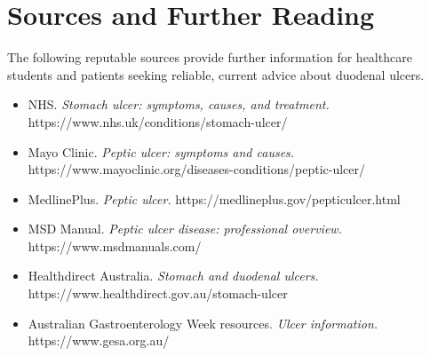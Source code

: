 \section*{Sources and Further Reading}
The following reputable sources provide further information for healthcare students and patients seeking reliable, current advice about duodenal ulcers.
\begin{itemize}
    \item NHS. \textit{Stomach ulcer: symptoms, causes, and treatment.} https://www.nhs.uk/conditions/stomach-ulcer/
    \item Mayo Clinic. \textit{Peptic ulcer: symptoms and causes.} https://www.mayoclinic.org/diseases-conditions/peptic-ulcer/
    \item MedlinePlus. \textit{Peptic ulcer.} https://medlineplus.gov/pepticulcer.html
    \item MSD Manual. \textit{Peptic ulcer disease: professional overview.} https://www.msdmanuals.com/
    \item Healthdirect Australia. \textit{Stomach and duodenal ulcers.} https://www.healthdirect.gov.au/stomach-ulcer
    \item Australian Gastroenterology Week resources. \textit{Ulcer information.} https://www.gesa.org.au/
\end{itemize}
